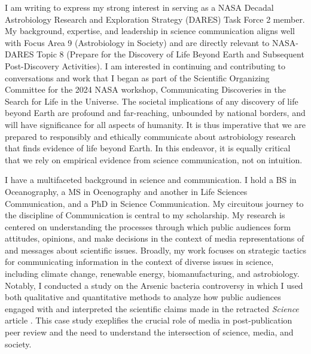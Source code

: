 \documentclass[12pt]{article}
\begin{document}
% 

I am writing to express my strong interest in serving as a NASA Decadal Astrobiology Research and Exploration Strategy (DARES) Task Force 2 member. My background, expertise, and leadership in science communication aligns well with Focus Area 9 (Astrobiology in Society) and are directly relevant to NASA-DARES Topic 8 (Prepare for the Discovery of Life Beyond Earth and Subsequent Post-Discovery Activities). I am interested in continuing and contributing to conversations and work that I began as part of the Scientific Organizing Committee for the 2024 NASA workshop, Communicating Discoveries in the Search for Life in the Universe. The societal implications of any discovery of life beyond Earth are profound and far-reaching, unbounded by national borders, and will have significance for all aspects of humanity. It is thus imperative that we are prepared to responsibly and ethically communicate about astrobiology research that finds evidence of life beyond Earth. In this endeavor, it is equally critical that we rely on empirical evidence from science communication, not on intuition.

\vspace{1em}

I have a multifaceted background in science and communication. I hold a BS in Oceanography, a MS in Ocenography and another in Life Sciences Communication, and a PhD in Science Communication. My circuitous journey to the discipline of Communication is central to my scholarship. My research is centered on understanding the processes through which public audiences form attitudes, opinions, and make decisions in the context of media representations of and messages about scientific issues. Broadly, my work focuses on strategic tactics for communicating information in the context of diverse issues in science, including climate change, renewable energy, biomanufacturing, and astrobiology. Notably, I conducted a study on the Arsenic bacteria controversy \parencite{yeoCaseArseniclifeBlogs2017} in which I used both qualitative and quantitative methods to analyze how public audiences engaged with and interpreted the scientific claims made in the retracted \textit{Science} article \parencite{wolfe-simonBacteriumThatCan2011}. This case study exeplifies the crucial role of media in post-publication peer review and the need to understand the intersection of science, media, and society.
\end{document}
